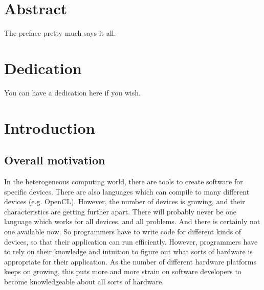 \documentclass[12pt,twoside]{reedthesis}
\begin{document}
    \tableofcontents
    \listoftables
    \listoffigures

    \chapter*{Abstract}
	The preface pretty much says it all.
	
	\chapter*{Dedication}
	You can have a dedication here if you wish.

  \mainmatter %
  \pagestyle{fancyplain} %





\chapter*{Introduction}
\lstset{language=C++}
	
	\section{Overall motivation}
		
		In the heterogeneous computing world, there are tools to create software for specific devices. There are also languages which can compile to many different devices (e.g. OpenCL). However, the number of devices is growing, and their characteristics are getting further apart. There will probably never be one language which works for all devices, and all problems. And there is certainly not one available now. So programmers have to write code for different kinds of devices, so that their application can run efficiently. However, programmers have to rely on their knowledge and intuition to figure out what sorts of hardware is appropriate for their application. As the number of different hardware platforms keeps on growing, this puts more and more strain on software developers to become knowledgeable about all sorts of hardware.
		
\end{document}
